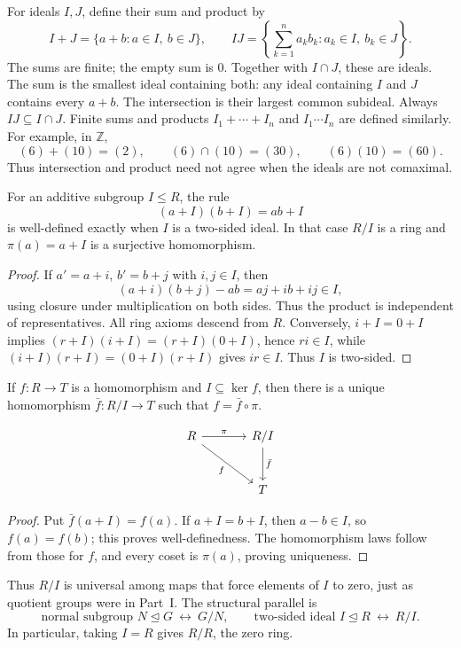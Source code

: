 For ideals \(I,J\), define their sum and product by
\[
I+J=\{a+b:a\in I,\ b\in J\},\qquad
IJ=\left\{\sum_{k=1}^n a_kb_k:a_k\in I,\ b_k\in J\right\}.
\]
The sums are finite; the empty sum is \(0\).  Together with \(I\cap J\),
these are ideals.  The sum is the smallest ideal containing both: any ideal
containing \(I\) and \(J\) contains every \(a+b\).  The intersection is their
largest common subideal. Always \(IJ\subseteq I\cap J\).  Finite sums and
products \(I_1+\cdots+I_n\) and \(I_1\cdots I_n\) are defined similarly.
For example, in \(\mathbb Z\),
\[(6)+(10)=(2),\qquad (6)\cap(10)=(30),\qquad (6)(10)=(60).\]
Thus intersection and product need not agree when the ideals are not
comaximal.

\begin{theorem}
For an additive subgroup \(I\le R\), the rule
\[(a+I)(b+I)=ab+I\]
is well-defined exactly when \(I\) is a two-sided ideal. In that case \(R/I\)
is a ring and \(\pi(a)=a+I\) is a surjective homomorphism.
\end{theorem}
\begin{proof}
If \(a'=a+i\), \(b'=b+j\) with \(i,j\in I\), then
\[(a+i)(b+j)-ab=aj+ib+ij\in I,\]
using closure under multiplication on both sides.  Thus the product is
independent of representatives.  All ring axioms descend from \(R\).
Conversely, \(i+I=0+I\) implies
\((r+I)(i+I)=(r+I)(0+I)\), hence \(ri\in I\), while
\((i+I)(r+I)=(0+I)(r+I)\) gives \(ir\in I\). Thus \(I\) is two-sided.
\end{proof}

\begin{theorem}
If \(f:R\to T\) is a homomorphism and \(I\subseteq\ker f\), then there is a
unique homomorphism \(\bar f:R/I\to T\) such that \(f=\bar f\circ\pi\).
\end{theorem}
\[
\begin{tikzcd}[column sep=large, row sep=large]
R \arrow[r, "\pi"] \arrow[dr, "f"'] & R/I \arrow[d, "\bar f"] \\
& T
\end{tikzcd}
\]
\begin{proof}
Put \(\bar f(a+I)=f(a)\). If \(a+I=b+I\), then \(a-b\in I\), so
\(f(a)=f(b)\); this proves well-definedness. The homomorphism laws follow
from those for \(f\), and every coset is \(\pi(a)\), proving uniqueness.
\end{proof}

Thus \(R/I\) is universal among maps that force elements of \(I\) to zero,
just as quotient groups were in Part~I.  The structural parallel is
\[
\text{normal subgroup }N\trianglelefteq G\ \longleftrightarrow\ G/N,
\qquad
\text{two-sided ideal }I\trianglelefteq R\ \longleftrightarrow\ R/I.
\]
In particular, taking \(I=R\) gives \(R/R\), the zero ring.

